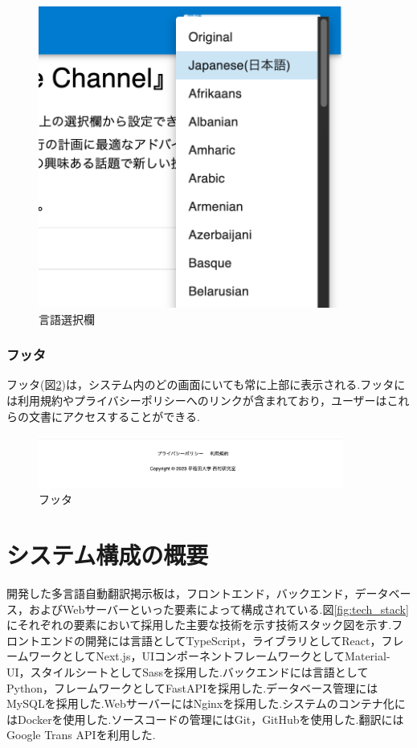 \documentclass[b5paper,12pt,dvipdfmx]{jsreport}
\begin{document}
\begin{figure}[H]
	\centering
    \includegraphics[width=100mm,height=99.22mm]{./img/feature/language_select.png}
	\caption{言語選択欄}
	\label{fig:language_select}
\end{figure}


\subsubsection{フッタ}
フッタ(図\ref{fig:footer})は，システム内のどの画面にいても常に上部に表示される.フッタには利用規約やプライバシーポリシーへのリンクが含まれており，ユーザーはこれらの文書にアクセスすることができる.

\begin{figure}[H]
	\centering
    \includegraphics[width=100mm,height=17.33mm]{./img/feature/footer.png}
	\caption{フッタ}
	\label{fig:footer}
\end{figure}


\section{システム構成の概要}
開発した多言語自動翻訳掲示板は，フロントエンド，バックエンド，データベース，およびWebサーバーといった要素によって構成されている.図\ref{fig:tech_stack}にそれぞれの要素において採用した主要な技術を示す技術スタック図を示す.フロントエンドの開発には言語としてTypeScript，ライブラリとしてReact，フレームワークとしてNext.js，UIコンポーネントフレームワークとしてMaterial-UI，スタイルシートとしてSassを採用した.バックエンドには言語としてPython，フレームワークとしてFastAPIを採用した.データベース管理にはMySQLを採用した.WebサーバーにはNginxを採用した.システムのコンテナ化にはDockerを使用した.ソースコードの管理にはGit，GitHubを使用した.翻訳にはGoogle Trans APIを利用した.
\end{document}
